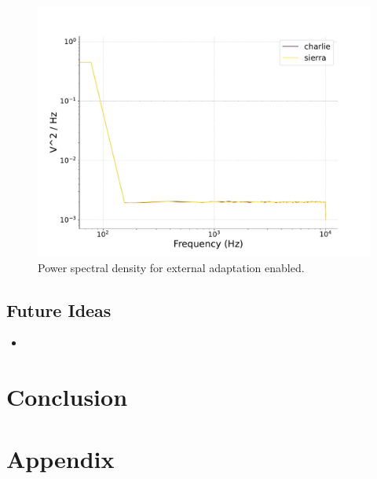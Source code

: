 \documentclass[a4paper,12pt]{article}
\begin{document}
\begin{figure}[htb!] 
    \centering
    \includegraphics[width=\linewidth]{nu_ext_76PSD_homeostasis_foxtrot.pdf}
    \caption{Power spectral density for external adaptation enabled.}
    \label{foxtrot76PSD}
\end{figure}

\subsection{Future Ideas}
\begin{itemize}
    \item 
\end{itemize}
\section{Conclusion}



\section{Appendix}
\end{document}
